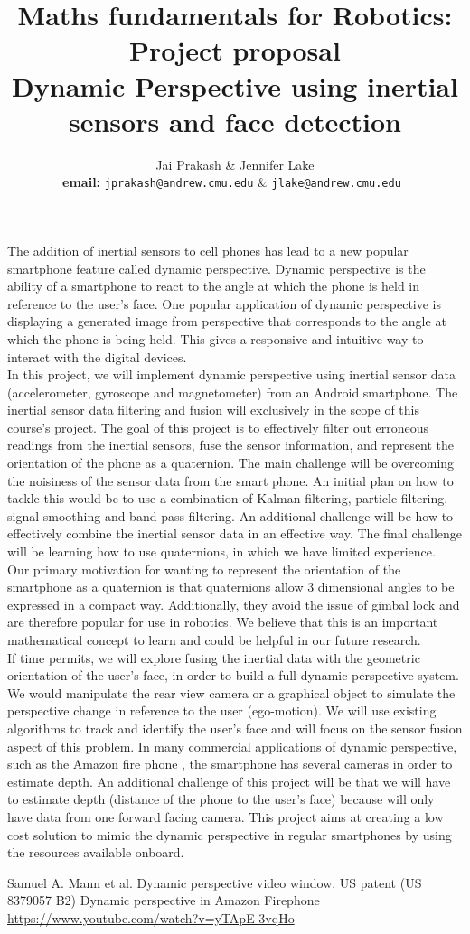 \documentclass{article}
\title{Maths fundamentals for Robotics: Project proposal\\
Dynamic Perspective using inertial sensors and face detection}
\author{Jai Prakash \& Jennifer Lake\\ \textbf{email:} \texttt{jprakash@andrew.cmu.edu} \& \texttt{jlake@andrew.cmu.edu }}
\begin{document}
\maketitle

The addition of inertial sensors to cell phones has lead to a new popular smartphone feature called dynamic perspective.  Dynamic perspective is the ability of a smartphone to react to the angle at which the phone is held in reference to the user’s face.  One popular application of dynamic perspective is displaying a generated image from perspective that corresponds to the angle at which the phone is being held.  This gives a responsive and intuitive way to interact with the digital devices.\\

In this project, we will implement dynamic perspective using inertial sensor data (accelerometer, gyroscope and magnetometer) from an Android smartphone.  The inertial sensor data filtering and fusion will exclusively in the scope of this course’s project.  The goal of this project is to effectively filter out erroneous readings from the inertial sensors, fuse the sensor information, and represent the orientation of the phone as a quaternion.  The main challenge will be overcoming the noisiness of the sensor data from the smart phone.  An initial plan on how to tackle this would be to use a combination of Kalman filtering, particle filtering, signal smoothing and band pass filtering.  An additional challenge will be how to effectively combine the inertial sensor data in an effective way.  The final challenge will be learning how to use quaternions, in which we have limited experience.\\

Our primary motivation for wanting to represent the orientation of the smartphone as a quaternion is that quaternions allow 3 dimensional angles to be expressed in a compact way.  Additionally, they avoid the issue of gimbal lock and are therefore popular for use in robotics.  We believe that this is an important mathematical concept to learn and could be helpful in our future research.\\

If time permits, we will explore fusing the inertial data with the geometric orientation of the user’s face, in order to build a full dynamic perspective system.  We would manipulate the rear view camera \cite{google} or a graphical object to simulate the perspective change in reference to the user (ego-motion).  We will use existing algorithms to track and identify the user’s face and will focus on the sensor fusion aspect of this problem. In many commercial applications of dynamic perspective, such as the Amazon fire phone \cite{amazon}, the smartphone has several cameras in order to estimate depth.  An additional challenge of this project will be that we will have to estimate depth (distance of the phone to the user’s face) because will only have data from one forward facing camera. This project aims at creating a low cost solution to mimic the dynamic perspective in regular smartphones by using the resources available onboard.

\begin{thebibliography}{1}
  Samuel A. Mann et al. Dynamic perspective video window. US patent (US 8379057 B2)
 Dynamic perspective in Amazon Firephone \url{https://www.youtube.com/watch?v=yTApE-3vqHo}
\end{thebibliography}
\end{document}
